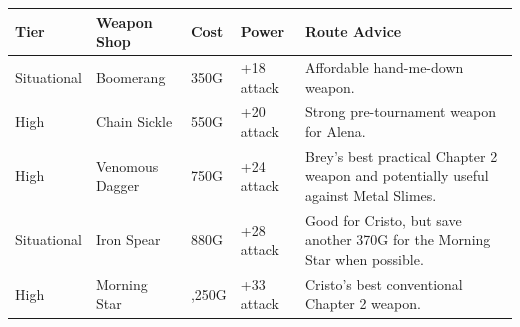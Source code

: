 \documentclass[
  american,
  10pt,
  letterpaper,
  oneside,
  open=any]{scrreprt}
\newcounter{none} %
\newenvironment{guidetable}{%
  \small\setstretch{1.0}%
  \setlength{\tabcolsep}{4pt}%
  \setlength{\LTpre}{8pt}\setlength{\LTpost}{10pt}%
  \renewcommand{\arraystretch}{1.16}%
}{ }
\begin{document}
\begin{guidetable}

{\def\LTcaptype{none} %
\begin{longtable}[]{@{}
  >{\raggedright\arraybackslash}p{}
  >{\raggedright\arraybackslash}p{}
  >{\raggedleft\arraybackslash}p{}
  >{\raggedleft\arraybackslash}p{}
  >{\raggedright\arraybackslash}p{}@{}}
\toprule\noalign{}
\begin{minipage}[b]{\linewidth}\raggedright
\color{GuideGreen}\bfseries Tier
\end{minipage} & \begin{minipage}[b]{\linewidth}\raggedright
\color{GuideGreen}\bfseries Weapon Shop
\end{minipage} & \begin{minipage}[b]{\linewidth}\raggedleft
\color{GuideGreen}\bfseries Cost
\end{minipage} & \begin{minipage}[b]{\linewidth}\raggedleft
\color{GuideGreen}\bfseries Power
\end{minipage} & \begin{minipage}[b]{\linewidth}\raggedright
\color{GuideGreen}\bfseries Route Advice
\end{minipage} \\
\midrule\noalign{}
\endhead
\bottomrule\noalign{}
\endlastfoot
Situational & Boomerang & 350G & +18 attack & Affordable hand-me-down
weapon. \\
High & Chain Sickle & 550G & +20 attack & Strong pre-tournament weapon
for Alena. \\
High & Venomous Dagger & 750G & +24 attack & Brey's best practical
Chapter 2 weapon and potentially useful against Metal Slimes. \\
Situational & Iron Spear & 880G & +28 attack & Good for Cristo, but save
another 370G for the Morning Star when possible. \\
High & Morning Star & 1,250G & +33 attack & Cristo's best conventional
Chapter 2 weapon. \\
\end{longtable}
}

\end{guidetable}
\end{document}
